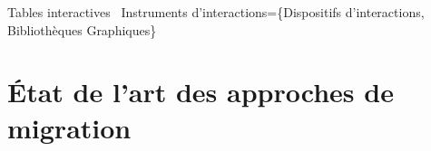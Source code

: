 \documentclass[11pt]{beamer}
\begin{document}
\begin{frame}[t]{Tables interactives{\tiny ~\cite{MitsubishiElectricResearchLaboratoriesb, Ullmer1997, Microsoft2011}}}
		{\scriptsize {Instruments d'interactions=\{Dispositifs d'interactions, Bibliothèques Graphiques\} }}
	
\pause
\end{frame}

\section[État de l'art]{État de l'art des approches de migration}
\end{document}
